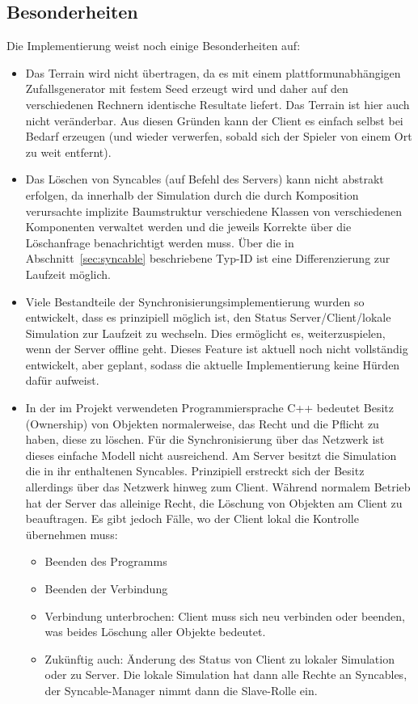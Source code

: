 \subsection{Besonderheiten}
Die Implementierung weist noch einige Besonderheiten auf:%
\begin{itemize}

\item Das Terrain wird nicht übertragen, da es mit einem plattformunabhängigen Zufallsgenerator mit festem Seed erzeugt wird und daher auf den verschiedenen Rechnern identische Resultate liefert. Das Terrain ist hier auch nicht veränderbar. Aus diesen Gründen kann der Client es einfach selbst bei Bedarf erzeugen (und wieder verwerfen, sobald sich der Spieler von einem Ort zu weit entfernt).

\item Das Löschen von Syncables (auf Befehl des Servers) kann nicht abstrakt erfolgen, da innerhalb der Simulation durch die durch Komposition verursachte implizite Baumstruktur verschiedene Klassen von verschiedenen Komponenten verwaltet werden und die jeweils Korrekte über die Löschanfrage benachrichtigt werden muss. Über die in Abschnitt~\ref{sec:syncable} beschriebene Typ-ID ist eine Differenzierung zur Laufzeit möglich.

\item Viele Bestandteile der Synchronisierungsimplementierung wurden so entwickelt, dass es prinzipiell möglich ist, den Status Server/Client/lokale Simulation zur Laufzeit zu wechseln. Dies ermöglicht es, weiterzuspielen, wenn der Server offline geht. Dieses Feature ist aktuell noch nicht vollständig entwickelt, aber geplant, sodass die aktuelle Implementierung keine Hürden dafür aufweist.

\item In der im Projekt verwendeten Programmiersprache C++ bedeutet Besitz (Ownership) von Objekten normalerweise, das Recht und die Pflicht zu haben, diese zu löschen. Für die Synchronisierung über das Netzwerk ist dieses einfache Modell nicht ausreichend. Am Server besitzt die Simulation die in ihr enthaltenen Syncables. Prinzipiell erstreckt sich der Besitz allerdings über das Netzwerk hinweg zum Client. Während normalem Betrieb hat der Server das alleinige Recht, die Löschung von Objekten am Client zu beauftragen. Es gibt jedoch Fälle, wo der Client lokal die Kontrolle übernehmen muss:
\begin{itemize}
\item Beenden des Programms
\item Beenden der Verbindung
\item Verbindung unterbrochen: Client muss sich neu verbinden oder beenden, was beides Löschung aller Objekte bedeutet.
\item Zukünftig auch: Änderung des Status von Client zu lokaler Simulation oder zu Server. Die lokale Simulation hat dann alle Rechte an Syncables, der Syncable-Manager nimmt dann die Slave-Rolle ein.
\end{itemize}


\end{itemize}
